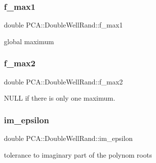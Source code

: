 \subsubsection{\texorpdfstring{f\+\_\+max1}{f\_max1}}
{\footnotesize\ttfamily double P\+C\+A\+::\+Double\+Well\+Rand\+::f\+\_\+max1\hspace{0.3cm}{\ttfamily [private]}}



global maximum 

\hypertarget{class_p_c_a_1_1_double_well_rand_a05278693e04d00a31bd41dedb38926b7}{}\label{class_p_c_a_1_1_double_well_rand_a05278693e04d00a31bd41dedb38926b7} 
\subsubsection{\texorpdfstring{f\+\_\+max2}{f\_max2}}
{\footnotesize\ttfamily double P\+C\+A\+::\+Double\+Well\+Rand\+::f\+\_\+max2\hspace{0.3cm}{\ttfamily [private]}}



N\+U\+LL if there is only one maximum. 

\hypertarget{class_p_c_a_1_1_double_well_rand_a5fa2e0c609851d3e8a8cb9eb4bbd90c6}{}\label{class_p_c_a_1_1_double_well_rand_a5fa2e0c609851d3e8a8cb9eb4bbd90c6} 
\subsubsection{\texorpdfstring{im\+\_\+epsilon}{im\_epsilon}}
{\footnotesize\ttfamily double P\+C\+A\+::\+Double\+Well\+Rand\+::im\+\_\+epsilon\hspace{0.3cm}{\ttfamily [private]}}



tolerance to imaginary part of the polynom roots 

\hypertarget{class_p_c_a_1_1_double_well_rand_a4792680466fc8f865be362937b3e4e3b}{}\label{class_p_c_a_1_1_double_well_rand_a4792680466fc8f865be362937b3e4e3b} 
